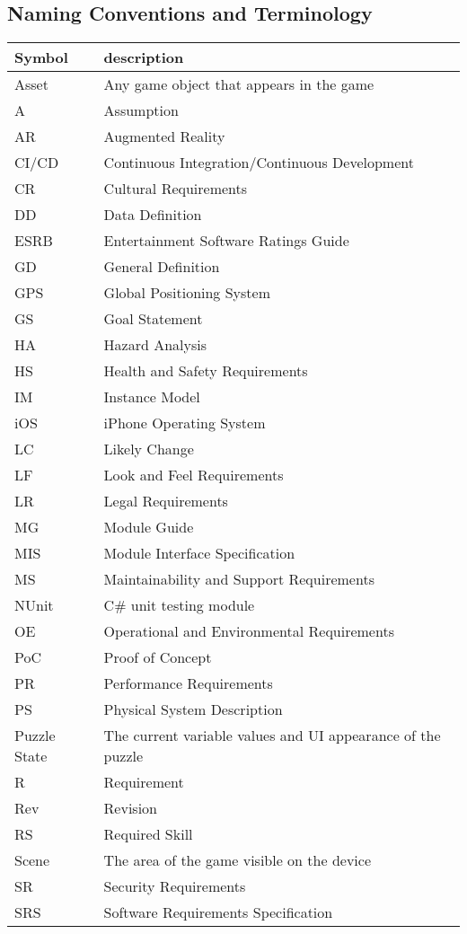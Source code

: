\documentclass[12pt]{article}
\begin{document}
\subsection{Naming Conventions and Terminology}
\label{Naming_Convention_Table}
\renewcommand{\arraystretch}{1.2}
\begin{tabular}{l l} 
  \toprule		
  \textbf{Symbol} & \textbf{description}\\
  \midrule 
  Asset & Any game object that appears in the game\\
  A & Assumption\\
  AR & Augmented Reality\\
  CI/CD & Continuous Integration/Continuous Development\\
  CR & Cultural Requirements\\
  DD & Data Definition\\
  ESRB & Entertainment Software Ratings Guide\\
  GD & General Definition\\
  GPS & Global Positioning System\\
  GS & Goal Statement\\
  HA & Hazard Analysis\\
  HS & Health and Safety Requirements\\
  IM & Instance Model\\
  iOS & iPhone Operating System\\
  LC & Likely Change\\
  LF & Look and Feel Requirements\\
  LR & Legal Requirements\\
  MG & Module Guide\\
  MIS & Module Interface Specification\\
  MS & Maintainability and Support Requirements\\
  NUnit & C\# unit testing module\\
  OE & Operational and Environmental Requirements\\
  PoC & Proof of Concept \\ 
  PR & Performance Requirements\\
  PS & Physical System Description\\
  Puzzle State & The current variable values and UI appearance of the puzzle\\
  R & Requirement\\
  Rev & Revision\\
  RS & Required Skill\\
  Scene & The area of the game visible on the device\\
  SR & Security Requirements\\
  SRS & Software Requirements Specification\\
    \bottomrule
\end{tabular}\\
\end{document}
